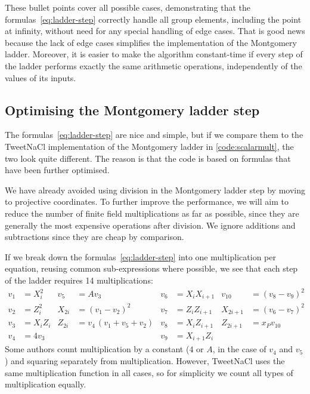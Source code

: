 \documentclass{article}
\begin{document}
These bullet points cover all possible cases, demonstrating that the formulas~\eqref{eq:ladder-step} correctly handle all group elements, including the point at infinity, without need for any special handling of edge cases.
That is good news because the lack of edge cases simplifies the implementation of the Montgomery ladder.
Moreover, it is easier to make the algorithm constant-time if every step of the ladder performs exactly the same arithmetic operations, independently of the values of its inputs.

\subsection{Optimising the Montgomery ladder step}\label{sec:ladder-optimised}

The formulas~\eqref{eq:ladder-step} are nice and simple, but if we compare them to the TweetNaCl implementation of the Montgomery ladder in \autoref{code:scalarmult}, the two look quite different.
The reason is that the code is based on formulas that have been further optimised.

We have already avoided using division in the Montgomery ladder step by moving to projective coordinates.
To further improve the performance, we will aim to reduce the number of finite field multiplications as far as possible, since they are generally the most expensive operations after division.
We ignore additions and subtractions since they are cheap by comparison.

If we break down the formulas~\eqref{eq:ladder-step} into one multiplication per equation, reusing common sub-expressions where possible, we see that each step of the ladder requires 14 multiplications:
\begin{align*}
    v_1 &= X_i^2    & v_5    &= A v_3                   & v_6 &= X_i X_{i+1}    & v_{10}   &= (v_8 - v_9)^2 \\
    v_2 &= Z_i^2    & X_{2i} &= (v_1 - v_2)^2           & v_7 &= Z_i Z_{i+1}    & X_{2i+1} &= (v_6 - v_7)^2 \\
    v_3 &= X_i Z_i  & Z_{2i} &= v_4\,(v_1 + v_5 + v_2)  & v_8 &= X_i Z_{i+1}    & Z_{2i+1} &= x_P v_{10}    \\
    v_4 &= 4 v_3    &        &                          & v_9 &= X_{i+1} Z_i
\end{align*}
Some authors count multiplication by a constant ($4$ or $A$, in the case of $v_4$ and $v_5$) and squaring separately from multiplication.
However, TweetNaCl uses the same multiplication function in all cases, so for simplicity we count all types of multiplication equally.
\end{document}

